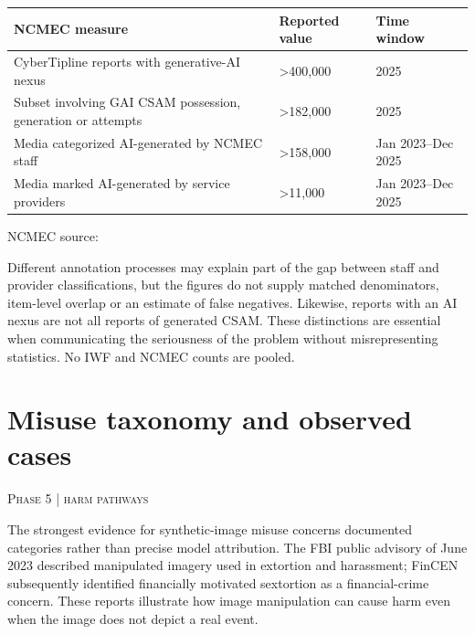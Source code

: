\documentclass[10pt,a4paper]{article}
\newcommand{\sect}[2]{\Needspace{6\baselineskip}\section{#1}\textcolor{muted}{\small\textsc{#2}}\par\vspace{2mm}}
\begin{document}
\begin{center}\small\begin{tabularx}{\linewidth}{@{}YYY@{}}\toprule
\textbf{NCMEC measure} & \textbf{Reported value} & \textbf{Time window}\\\midrule
CyberTipline reports with generative-AI nexus & >400,000 & 2025\\
Subset involving GAI CSAM possession, generation or attempts & >182,000 & 2025\\
Media categorized AI-generated by NCMEC staff & >158,000 & Jan 2023--Dec 2025\\
Media marked AI-generated by service providers & >11,000 & Jan 2023--Dec 2025\\\bottomrule\end{tabularx}\end{center}

NCMEC source:  \cite{ncmec,ncmec25}


Different annotation processes may explain part of the gap between staff and provider classifications, but the figures do not supply matched denominators, item-level overlap or an estimate of false negatives. Likewise, reports with an AI nexus are not all reports of generated CSAM. These distinctions are essential when communicating the seriousness of the problem without misrepresenting statistics. No IWF and NCMEC counts are pooled.


\sect{Misuse taxonomy and observed cases}{Phase 5 | harm pathways}

The strongest evidence for synthetic-image misuse concerns documented categories rather than precise model attribution. The FBI public advisory of June 2023 described manipulated imagery used in extortion and harassment; FinCEN subsequently identified financially motivated sextortion as a financial-crime concern. These reports illustrate how image manipulation can cause harm even when the image does not depict a real event. \cite{fbi,fincen}
\end{document}
